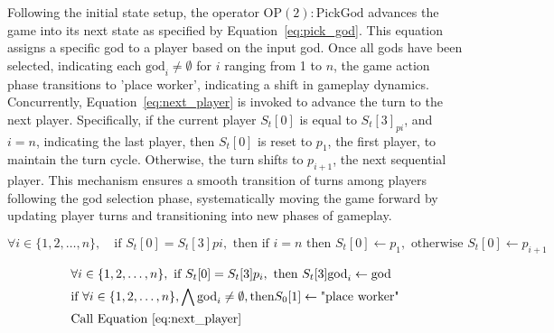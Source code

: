 \documentclass{telkomnika}
\begin{document}
Following the initial state setup, the operator \( \text{OP}(2): \text{PickGod} \) advances the game into its next state as specified by Equation~\ref{eq:pick_god}. This equation assigns a specific god to a player based on the input god. Once all gods have been selected, indicating each \( \text{god}_i \neq \emptyset \) for \( i \) ranging from 1 to \( n \), the game action phase transitions to 'place worker', indicating a shift in gameplay dynamics. Concurrently, Equation~\ref{eq:next_player} is invoked to advance the turn to the next player. Specifically, if the current player \( S_t[0] \) is equal to \( S_t[3]_{pi} \), and \( i = n \), indicating the last player, then \( S_t[0] \) is reset to \( p_1 \), the first player, to maintain the turn cycle. Otherwise, the turn shifts to \( p_{i+1} \), the next sequential player. This mechanism ensures a smooth transition of turns among players following the god selection phase, systematically moving the game forward by updating player turns and transitioning into new phases of gameplay.

\begin{equation}
\label{eq:next_player}
\forall i \in \{1, 2, \ldots, n\}, \quad \text{if } S_t[0] = S_t[3]{pi}, \text{ then if } i=n \text{ then } S_t[0] \leftarrow p_1, \text{ otherwise } S_t[0] \leftarrow p_{i+1}
\end{equation}

\begin{equation}
    \begin{aligned}
        &\forall i \in \{1,2,\ldots, n\}, \text{ if } S_t[0] = S_t[3]p_i, \text{ then } S_t[3]\text{god}_i \leftarrow \text{god}\\
        &\text{if }\forall i \in \{1,2,\dots,n\}, \bigwedge \text{god}_i \neq \emptyset,\text{then} S_0[1] \leftarrow \text{"place worker"}\\
        &\text{Call Equation~\ref{eq:next_player}}
    \end{aligned}
    \label{eq:pick_god}
\end{equation}
\end{document}
